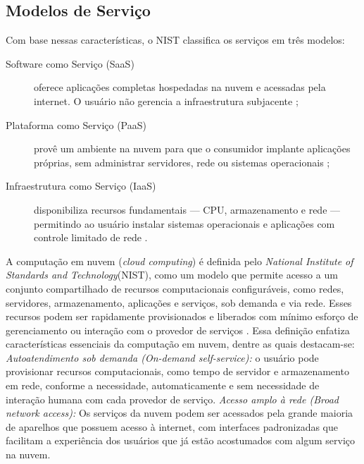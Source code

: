 \subsection{Modelos de Serviço}

Com base nessas características, o NIST classifica os serviços em três modelos:

\begin{description}
    \item[Software como Serviço (SaaS)] oferece aplicações completas hospedadas na nuvem e acessadas pela internet. O usuário não gerencia a infraestrutura subjacente \cite{mell2011};
    \item[Plataforma como Serviço (PaaS)] provê um ambiente na nuvem para que o consumidor implante aplicações próprias, sem administrar servidores, rede ou sistemas operacionais \cite{mell2011};
    \item[Infraestrutura como Serviço (IaaS)] disponibiliza recursos fundamentais — CPU, armazenamento e rede — permitindo ao usuário instalar sistemas operacionais e aplicações com controle limitado de rede \cite{mell2011}.
\end{description}



A computação em nuvem (\textit{cloud computing}) é definida pelo \textit{National Institute of Standards and Technology}(NIST), como um modelo que permite acesso a um conjunto compartilhado de recursos computacionais configuráveis, como redes, servidores, armazenamento, aplicações e serviços,  sob demanda e via rede. Esses recursos podem ser rapidamente provisionados e liberados com mínimo esforço de gerenciamento ou interação com o provedor de serviços \cite{mell2011}. Essa definição enfatiza características essenciais da computação em nuvem, dentre as quais destacam-se: 
\emph{Autoatendimento sob demanda (\textit{On-demand self-service}):} o usuário pode provisionar recursos computacionais, como tempo de servidor e armazenamento em rede, conforme a necessidade, automaticamente e sem necessidade de interação humana com cada provedor de serviço.
\emph{Acesso amplo à rede (\textit{Broad network access}):} Os serviços da nuvem podem ser acessados pela grande maioria de aparelhos que possuem acesso à internet, com interfaces padronizadas que facilitam a experiência dos usuários que já estão acostumados com algum serviço na nuvem.
 
